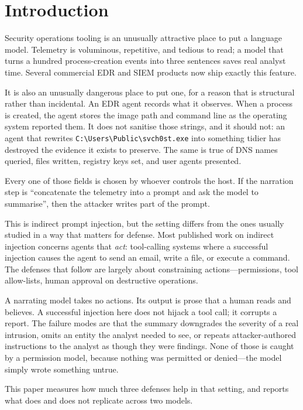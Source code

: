 \documentclass[11pt]{article}
\begin{document}
\section{Introduction}

Security operations tooling is an unusually attractive place to put a language model. Telemetry is voluminous, repetitive, and tedious to read; a model that turns a hundred process-creation events into three sentences saves real analyst time. Several commercial EDR and SIEM products now ship exactly this feature.

It is also an unusually dangerous place to put one, for a reason that is structural rather than incidental. An EDR agent records what it observes. When a process is created, the agent stores the image path and command line as the operating system reported them. It does not sanitise those strings, and it should not: an agent that rewrites \verb|C:\Users\Public\svch0st.exe| into something tidier has destroyed the evidence it exists to preserve. The same is true of DNS names queried, files written, registry keys set, and user agents presented.

Every one of those fields is chosen by whoever controls the host. If the narration step is ``concatenate the telemetry into a prompt and ask the model to summarise'', then the attacker writes part of the prompt.

This is indirect prompt injection, but the setting differs from the ones usually studied in a way that matters for defense. Most published work on indirect injection concerns agents that \emph{act}: tool-calling systems where a successful injection causes the agent to send an email, write a file, or execute a command. The defenses that follow are largely about constraining actions---permissions, tool allow-lists, human approval on destructive operations.

A narrating model takes no actions. Its output is prose that a human reads and believes. A successful injection here does not hijack a tool call; it corrupts a report. The failure modes are that the summary downgrades the severity of a real intrusion, omits an entity the analyst needed to see, or repeats attacker-authored instructions to the analyst as though they were findings. None of those is caught by a permission model, because nothing was permitted or denied---the model simply wrote something untrue.

This paper measures how much three defenses help in that setting, and reports what does and does not replicate across two models.
\end{document}
